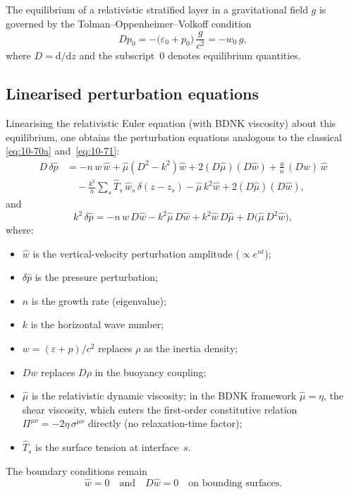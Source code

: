 The equilibrium of a relativistic stratified layer in a gravitational
field $g$ is governed by the Tolman--Oppenheimer--Volkoff condition
\begin{equation}\label{eq:rel-10-TOV}
  Dp_{0} = -\bigl(\varepsilon_{0} + p_{0}\bigr)\,\frac{g}{c^{2}}
  = -w_{0}\,g,
\end{equation}
where $D = \mathrm{d}/\mathrm{d}z$ and the subscript~0 denotes
equilibrium quantities.

\subsection{Linearised perturbation equations}

Linearising the relativistic Euler equation (with BDNK
viscosity) about this equilibrium, one obtains the perturbation
equations analogous to the classical \eqref{eq:10-70a}
and~\eqref{eq:10-71}:
\begin{align}\label{eq:rel-10-70a}
  D\,\delta\hat{p} &= -n\,w\,\hat{w}
  + \hat{\mu}(D^{2}-k^{2})\hat{w}
  + 2(D\hat{\mu})(D\hat{w})
  + \frac{g}{n}\,(Dw)\,\hat{w}
  \nonumber\\
  &\quad
  - \frac{k^{2}}{n}\sum_{s}\hat{T}_{s}\,\hat{w}_{s}\,
    \delta(z - z_{s})
  - \hat{\mu}\,k^{2}\hat{w}
  + 2(D\hat{\mu})(D\hat{w}),
\end{align}
and
\begin{equation}\label{eq:rel-10-71}
  k^{2}\,\delta\hat{p}
  = -n\,w\,D\hat{w}
  - k^{2}\hat{\mu}\,D\hat{w}
  + k^{2}\hat{w}\,D\hat{\mu}
  + D\!\bigl(\hat{\mu}\,D^{2}\hat{w}\bigr),
\end{equation}
where:
\begin{itemize}
\item $\hat{w}$ is the vertical-velocity perturbation amplitude
  ($\propto e^{nt}$);
\item $\delta\hat{p}$ is the pressure perturbation;
\item $n$ is the growth rate (eigenvalue);
\item $k$ is the horizontal wave number;
\item $w = (\varepsilon + p)/c^{2}$ replaces $\rho$ as the inertia
  density;
\item $Dw$ replaces $D\rho$ in the buoyancy coupling;
\item $\hat{\mu}$ is the relativistic dynamic viscosity; in the
  BDNK framework $\hat{\mu} = \eta$, the shear viscosity, which
  enters the first-order constitutive relation
  $\Pi^{\mu\nu} = -2\eta\,\sigma^{\mu\nu}$ directly (no
  relaxation-time factor);
\item $\hat{T}_{s}$ is the surface tension at interface~$s$.
\end{itemize}
The boundary conditions remain
\begin{equation}\label{eq:rel-10-72}
  \hat{w} = 0 \quad\text{and}\quad D\hat{w} = 0
  \quad\text{on bounding surfaces.}
\end{equation}

